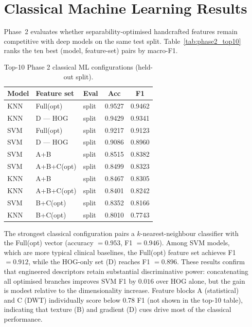 \documentclass[11pt]{article}
\begin{document}
\section{Classical Machine Learning Results}


Phase~2 evaluates whether separability-optimised handcrafted features remain competitive with deep models on the same test split.
Table~\ref{tab:phase2_top10} ranks the ten best (model, feature-set) pairs by macro-F1.

\begin{table}
\centering
\caption{Top-10 Phase 2 classical ML configurations (held-out split).}

\begin{tabular}{@{}lllcc@{}}
\hline
Model & Feature set & Eval & Acc & F1 \\
\hline
KNN & Full(opt) & split & 0.9527 & 0.9462 \\
KNN & D — HOG & split & 0.9429 & 0.9341 \\
SVM & Full(opt) & split & 0.9217 & 0.9123 \\
SVM & D — HOG & split & 0.9086 & 0.8960 \\
SVM & A+B & split & 0.8515 & 0.8382 \\
SVM & A+B+C(opt) & split & 0.8499 & 0.8323 \\
KNN & A+B & split & 0.8467 & 0.8305 \\
KNN & A+B+C(opt) & split & 0.8401 & 0.8242 \\
SVM & B+C(opt) & split & 0.8352 & 0.8166 \\
KNN & B+C(opt) & split & 0.8010 & 0.7743 \\
\hline
\end{tabular}
\end{table}


The strongest classical configuration pairs a $k$-nearest-neighbour classifier with the Full(opt) vector (accuracy $=0.953$, F1 $=0.946$).
Among SVM models, which are more typical clinical baselines, the Full(opt) feature set achieves F1 $=0.912$, while the HOG-only set (D) reaches F1 $=0.896$.
These results confirm that engineered descriptors retain substantial discriminative power: concatenating all optimised branches improves SVM F1 by $0.016$ over HOG alone, but the gain is modest relative to the dimensionality increase.
Feature blocks A (statistical) and C (DWT) individually score below 0.78 F1 (not shown in the top-10 table), indicating that texture (B) and gradient (D) cues drive most of the classical performance.
\end{document}
